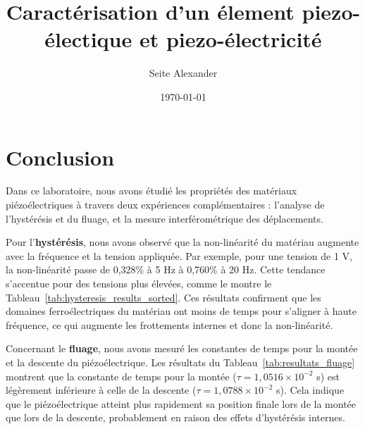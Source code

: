 \documentclass[letterpaper,12pt]{article}
\begin{document}
\title{Caractérisation d'un élement piezo-électique et piezo-électricité}

\author{Seite Alexander}
\date{\today}
\maketitle
\newline

\tableofcontents

\newpage









\section{Conclusion}
Dans ce laboratoire, nous avons étudié les propriétés des matériaux piézoélectriques à travers deux expériences complémentaires : l'analyse de l'hystérésis et du fluage, et la mesure interférométrique des déplacements.

Pour l'\textbf{hystérésis}, nous avons observé que la non-linéarité du matériau augmente avec la fréquence et la tension appliquée. Par exemple, pour une tension de 1 V, la non-linéarité passe de 0,328\% à 5 Hz à 0,760\% à 20 Hz. Cette tendance s'accentue pour des tensions plus élevées, comme le montre le Tableau~\ref{tab:hysteresis_results_sorted}. Ces résultats confirment que les domaines ferroélectriques du matériau ont moins de temps pour s'aligner à haute fréquence, ce qui augmente les frottements internes et donc la non-linéarité.

Concernant le \textbf{fluage}, nous avons mesuré les constantes de temps pour la montée et la descente du piézoélectrique. Les résultats du Tableau~\ref{tab:resultats_fluage} montrent que la constante de temps pour la montée ($\tau = 1,0516 \times 10^{-2}$ s) est légèrement inférieure à celle de la descente ($\tau = 1,0788 \times 10^{-2}$ s). Cela indique que le piézoélectrique atteint plus rapidement sa position finale lors de la montée que lors de la descente, probablement en raison des effets d'hystérésis internes.
\end{document}
